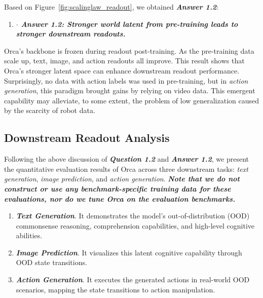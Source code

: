 Based on Figure~\ref{fig:scalinglaw_readout}, we obtained \textbf{\textit{Answer 1.2}}:

\vspace{-1ex}
\begin{enumerate}[label={}, leftmargin=10pt, itemindent=0pt, itemsep=0.3em, topsep=0.3em]
\item[] \textit{\textbf{$\cdot$ Answer 1.2: Stronger world latent from pre-training leads to stronger downstream readouts.}} 
\end{enumerate}

Orca's backbone is frozen during readout post-training. As the pre-training data scale up, text, image, and action readouts all improve. This result shows that Orca's stronger latent space can enhance downstream readout performance. Surprisingly, no data with action labels was used in pre-training, but in \textit{action generation}, this paradigm brought gains by relying on video data. This emergent capability may alleviate, to some extent, the problem of low generalization caused by the scarcity of robot data.


\subsection{Downstream Readout Analysis}

Following the above discussion of \textbf{\textit{Question 1.2}} and \textbf{\textit{Answer 1.2}}, we present the quantitative evaluation results of Orca across three downstream tasks: \textit{text generation}, \textit{image prediction}, and \textit{action generation}. \textbf{\textit{Note that we do not construct or use any benchmark-specific training data for these evaluations, nor do we tune Orca on the evaluation benchmarks.}}



\vspace{-2ex}
\begin{enumerate}
    \item \textbf{\textit{Text Generation}}. It demonstrates the model's out-of-distribution (OOD) commonsense reasoning, comprehension capabilities, and high-level cognitive abilities.
    \item \textbf{\textit{Image Prediction}}. It visualizes this latent cognitive capability through OOD state transitions.
    \item \textit{\textbf{Action Generation}}. It executes the generated actions in real-world OOD scenarios, mapping the state transitions to action manipulation.
\end{enumerate}

